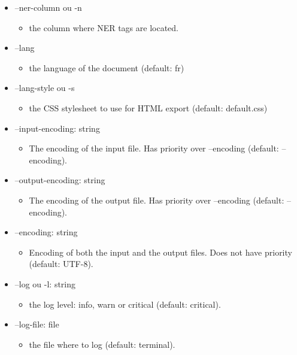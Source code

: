 \documentclass[manual-fr.tex]{subfiles}
\begin{document}
\begin{itemize}
\begin{itemize}
\begin{itemize}
                \end{itemize}
            \item[] --ner-column ou -n
                \begin{itemize}
                    \item[] the column where NER tags are located.
                \end{itemize}
            \item[] --lang
                \begin{itemize}
                    \item[] the language of the document (default: fr)
                \end{itemize}
            \item[] --lang-style ou -s
                \begin{itemize}
                    \item[] the CSS stylesheet to use for HTML export (default: default.css)
                \end{itemize}
            \item[] --input-encoding: string
                \begin{itemize}
                    \item[] The encoding of the input file. Has priority over --encoding (default: --encoding).
                \end{itemize}
            \item[] --output-encoding: string
                \begin{itemize}
                    \item[] The encoding of the output file. Has priority over --encoding (default: --encoding).
                \end{itemize}
            \item[] --encoding: string
                \begin{itemize}
                    \item[] Encoding of both the input and the output files. Does not have priority (default: UTF-8).
                \end{itemize}
            \item[] --log ou -l: string
                \begin{itemize}
                    \item[] the log level: info, warn or critical (default: critical).
                \end{itemize}
            \item[] --log-file: file
                \begin{itemize}
                    \item[] the file where to log (default: terminal).
                \end{itemize}
        \end{itemize}
\end{itemize}
\end{document}
